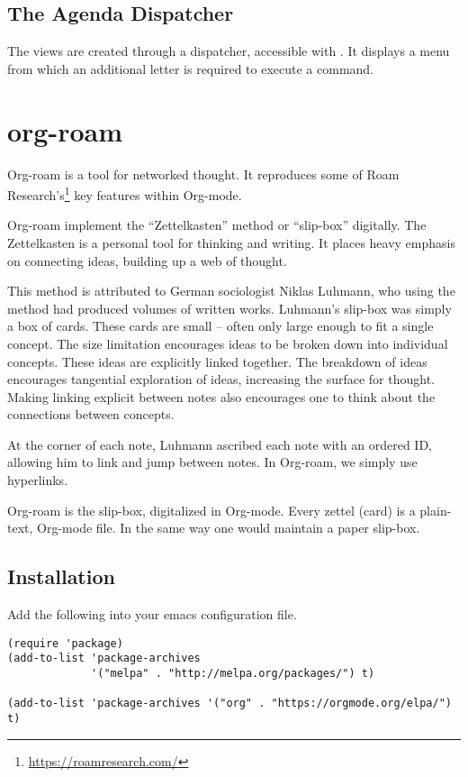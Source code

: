 \subsection{The Agenda Dispatcher}
\label{sec:agenda-dispatcher}

The views are created through a dispatcher, accessible with .
It displays a menu from which an additional letter is required to execute a command.





\section{org-roam}
\label{sec:org-roam}

Org-roam is a tool for networked thought.
It reproduces some of Roam Research’s\footnote{\url{https://roamresearch.com/}}  key features within Org-mode.


Org-roam implement the ``Zettelkasten'' method or ``slip-box'' digitally.
The Zettelkasten is a personal tool for thinking and writing.
It places heavy emphasis on connecting ideas, building up a web of thought.

This method is attributed to German sociologist Niklas Luhmann, who using the method had produced volumes of written works.
Luhmann’s slip-box was simply a box of cards.
These cards are small – often only large enough to fit a single concept.
The size limitation encourages ideas to be broken down into individual concepts.
These ideas are explicitly linked together.
The breakdown of ideas encourages tangential exploration of ideas, increasing the surface for thought.
Making linking explicit between notes also encourages one to think about the connections between concepts.

At the corner of each note, Luhmann ascribed each note with an ordered ID, allowing him to link and jump between notes.
In Org-roam, we simply use hyperlinks.

Org-roam is the slip-box, digitalized in Org-mode.
Every zettel (card) is a plain-text, Org-mode file.
In the same way one would maintain a paper slip-box.

\subsection{Installation}
\label{sec:installation-2}

Add the following into your emacs configuration file.
\begin{lstlisting}[language=elisp]
(require 'package)
(add-to-list 'package-archives
             '("melpa" . "http://melpa.org/packages/") t)

(add-to-list 'package-archives '("org" . "https://orgmode.org/elpa/") t)
\end{lstlisting}


